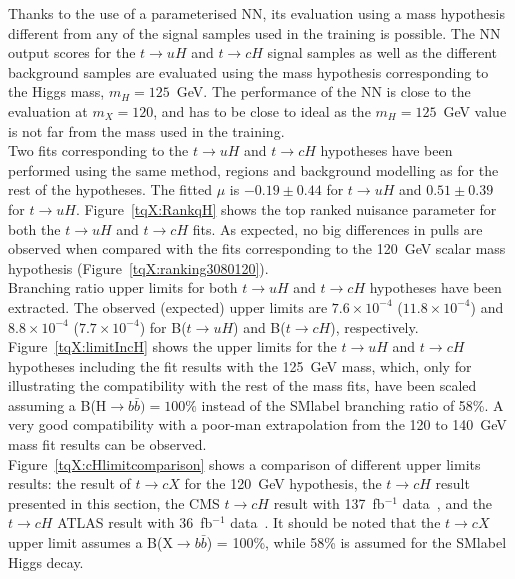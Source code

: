 Thanks to the use of a parameterised NN, its evaluation using a mass hypothesis different from any of the signal samples used in the training is possible. The NN output scores for the $t\to uH$ and $t\to cH$ signal samples as well as the different background samples are evaluated using the mass hypothesis corresponding to the Higgs mass, $m_H=125$~GeV. The performance of the NN is close to the evaluation at $m_X=120$, and has to be close to ideal as the $m_H=125$~GeV value is not far from the mass used in the training.\\

Two fits corresponding to the $t\to uH$ and $t\to cH$ hypotheses have been performed using the same method, regions and background modelling as for the rest of the hypotheses. The fitted $\mu$ is $-0.19\pm0.44$ for $t\to uH$ and $0.51\pm0.39$ for $t\to uH$. Figure~\ref{tqX:RankqH} shows the top ranked nuisance parameter for both the $t\to uH$ and $t\to cH$ fits. As expected, no big differences in pulls are observed when compared with the fits corresponding to the 120~GeV scalar mass hypothesis (Figure~\ref{tqX:ranking3080120}).\\

Branching ratio upper limits for both $t\to uH$ and $t\to cH$ hypotheses have been extracted. The observed (expected) upper limits are $7.6\times10^{-4}$ ($11.8\times10^{-4}$) and $8.8\times10^{-4}$ ($7.7\times10^{-4}$) for B($t\to uH$) and B($t\to cH$), respectively. Figure~\ref{tqX:limitIncH} shows the upper limits for the $t\to uH$ and $t\to cH$ hypotheses including the fit results with the 125~GeV mass, which, only for illustrating the compatibility with the rest of the mass fits, have been scaled assuming a B(H$\rightarrow b \bar{b}) = 100\%$ instead of the \acrshort{SMlabel} branching ratio of 58\%. A very good compatibility with a poor-man extrapolation from the 120 to 140~GeV mass fit results can be observed.\\

Figure~\ref{tqX:cHlimitcomparison} shows a comparison of different upper limits results: the result of $t\to cX$ for the 120~GeV hypothesis, the $t\to cH$ result presented in this section, the CMS $t\to cH$ result with 137~fb$^{-1}$ data~\cite{CMStqHRun2}, and the $t\to cH$ ATLAS result with 36~fb$^{-1}$ data~\cite{TOPQ-2017-07}. It should be noted that the $t\to cX$ upper limit assumes a B(X$\rightarrow b \bar{b}$) = 100\%, while 58\% is assumed for the \acrshort{SMlabel} Higgs decay.\\

